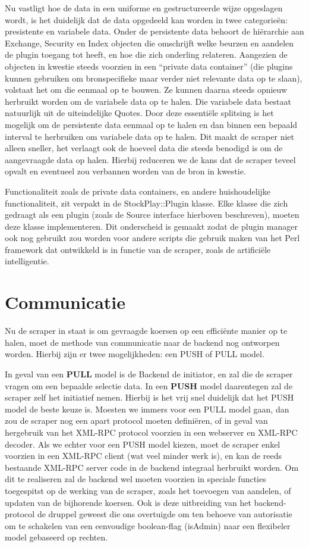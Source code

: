 Nu vastligt hoe de data in een uniforme en gestructureerde wijze opgeslagen wordt, is het duidelijk dat de data opgedeeld kan worden in twee categorie\"en: presistente en variabele data.
Onder de persistente data behoort de hi\"erarchie aan Exchange, Security en Index objecten die omschrijft welke beurzen en aandelen de plugin toegang tot heeft, en hoe die zich onderling relateren. Aangezien de objecten in kwestie steeds voorzien in een ``private data container'' (die plugins kunnen gebruiken om bronspecifieke maar verder niet relevante data op te slaan), volstaat het om die eenmaal op te bouwen. Ze kunnen daarna steeds opnieuw herbruikt worden om de variabele data op te halen. Die variabele data bestaat natuurlijk uit de uiteindelijke Quotes.
Door deze essenti\"ele splitsing is het mogelijk om de persistente data eenmaal op te halen en dan binnen een bepaald interval te herbruiken om variabele data op te halen. Dit maakt de scraper niet alleen sneller, het verlaagt ook de hoeveel data die steeds benodigd is om de aangevraagde data op halen. Hierbij reduceren we de kans dat de scraper teveel opvalt en eventueel zou verbannen worden van de bron in kwestie.

Functionaliteit zoals de private data containers, en andere huishoudelijke functionaliteit, zit verpakt in de StockPlay::Plugin klasse. Elke klasse die zich gedraagt als een plugin (zoals de Source interface hierboven beschreven), moeten deze klasse implementeren. Dit onderscheid is gemaakt zodat de plugin manager ook nog gebruikt zou worden voor andere scripts die gebruik maken van het Perl framework dat ontwikkeld is in functie van de scraper, zoals de artifici\"ele intelligentie.

\section{Communicatie}

Nu de scraper in staat is om gevraagde koersen op een effici\"ente manier op te halen, moet de methode van communicatie naar de backend nog ontworpen worden. Hierbij zijn er twee mogelijkheden: een PUSH of PULL model.

In geval van een \textbf{PULL} model is de Backend de initiator, en zal die de scraper vragen om een bepaalde selectie data. In een \textbf{PUSH} model daarentegen zal de scraper zelf het initiatief nemen. Hierbij is het vrij snel duidelijk dat het PUSH model de beste keuze is. Moesten we immers voor een PULL model gaan, dan zou de scraper nog een apart protocol moeten defini\"eren, of in geval van hergebruik van het XML-RPC protocol voorzien in een webserver en XML-RPC decoder. Als we echter voor een PUSH model kiezen, moet de scraper enkel voorzien in een XML-RPC client (wat veel minder werk is), en kan de reeds bestaande XML-RPC server code in de backend integraal herbruikt worden.
Om dit te realiseren zal de backend wel moeten voorzien in speciale functies toegespitst op de werking van de scraper, zoals het toevoegen van aandelen, of updaten van de bijhorende koersen. Ook is deze uitbreiding van het backend-protocol de druppel geweest die ons overtuigde om ten behoeve van autorisatie om te schakelen van een eenvoudige boolean-flag (isAdmin) naar een flexibeler model gebaseerd op rechten.

